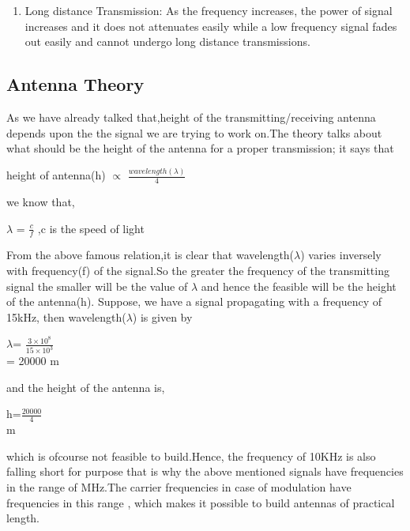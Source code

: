 \documentclass[12pt,a4paper]{article}%
\begin{document}
\begin{flushleft}
\begin{flushleft}
\begin{enumerate}
				\item{\large Long distance Transmission: }As the frequency increases, the power of signal increases and it does not attenuates easily while a low frequency signal fades out easily and cannot undergo long distance transmissions.
			\end{enumerate}
		\end{flushleft}
		\subsection{Antenna Theory}
		\begin{flushleft}
			\fontsize{12pt}{18pt}\selectfont As we have already talked that,height of the transmitting/receiving antenna depends upon the the signal we are trying to work on.The theory talks about what should be the height of the antenna for a proper transmission; it says that \\\bigskip
			\begin{center}  height of antenna(h) $\propto$ $\frac{wavelength(\lambda)}{4}$
			\end{center}
			we know that,
			\begin{center}
				$\lambda$ = $\frac{c}{f}$                        ,c is the speed of light
			\end{center} 
			From the above famous relation,it is clear that wavelength($\lambda$) varies inversely with frequency(f) of the signal.So the greater the frequency of the transmitting signal the smaller will be the value of $\lambda$ and hence the feasible will be the height of the antenna(h).
			Suppose, we have a signal propagating with a frequency of 15kHz, then wavelength($\lambda$) is given by\\\bigskip
			\begin{center}	$\lambda$= $\frac{3\times 10^8}{15 \times 10^3}$  \\\bigskip
				= 20000 m                  
			\end{center}
			and the height of the antenna is, 
			\begin{center}
				h=$\frac{20000}{4}$    \\ m
			\end{center}
			which is ofcourse not feasible to build.Hence, the frequency of 10KHz is also falling short for purpose that is why the above mentioned signals have frequencies in the range of MHz.The carrier frequencies in case of modulation have frequencies in this range , which makes it possible to build antennas of practical length.\\\bigskip

\end{flushleft}
\end{flushleft}
\end{document}
